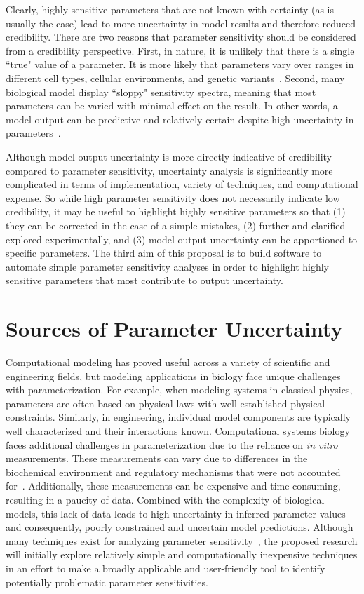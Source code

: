 \documentclass[12pt]{report}
\begin{document}
Clearly, highly sensitive parameters that are not known with certainty (as is usually the case) lead to more uncertainty in model results and therefore reduced credibility. There are two reasons that parameter sensitivity should be considered from a credibility perspective. First, in nature, it is unlikely that there is a single ``true" value of a parameter. It is more likely that parameters vary over ranges in different cell types, cellular environments, and genetic variants~\cite{Zi2008}. Second, many biological model display ``sloppy" sensitivity spectra, meaning that most parameters can be varied with minimal effect on the result. In other words, a model output can be predictive and relatively certain despite high uncertainty in parameters~\cite{Gutenkunst2007}.

Although model output uncertainty is more directly indicative of credibility compared to parameter sensitivity, uncertainty analysis is significantly more complicated in terms of implementation, variety of techniques, and computational expense. So while high parameter sensitivity does not necessarily indicate low credibility, it may be useful to highlight highly sensitive parameters so that (1) they can be corrected in the case of a simple mistakes, (2) further and clarified explored experimentally, and (3) model output uncertainty can be apportioned to specific parameters. The third aim of this proposal is to build software to automate simple parameter sensitivity analyses in order to highlight highly sensitive parameters that most contribute to output uncertainty. 



\section{Sources of Parameter Uncertainty}
Computational  modeling has proved useful across a variety of scientific and engineering fields, but modeling applications in biology face unique challenges with parameterization. For example, when modeling systems in classical physics, parameters are often based on physical laws with well established physical constraints. Similarly, in engineering, individual model components are typically well characterized and their interactions known. Computational systems biology faces additional challenges in parameterization due to the reliance on \textit{in vitro} measurements. These measurements can vary due to differences in the biochemical environment and regulatory mechanisms that were not accounted for~\cite{Vanlier2013}. Additionally, these measurements can be expensive and time consuming, resulting in a paucity of data. Combined with the complexity of biological models, this lack of data leads to high uncertainty in inferred parameter values and consequently, poorly constrained and uncertain model predictions.
Although many techniques exist for analyzing parameter sensitivity~\cite{Vanlier2013, Zi2011, vanMourik2014, Volodina2021}, the proposed research will initially explore relatively simple and computationally inexpensive techniques in an effort to make a broadly applicable and user-friendly tool to identify potentially problematic parameter sensitivities.
\end{document}
